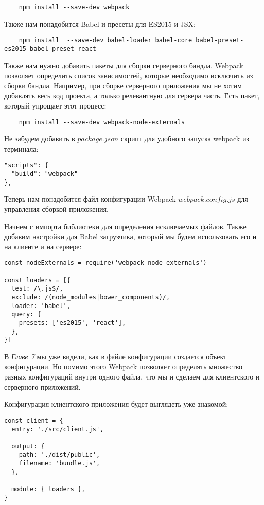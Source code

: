\begin{lstlisting}
	npm install --save-dev webpack
\end{lstlisting}

Также нам понадобится Babel и пресеты для ES2015 и JSX:

\begin{lstlisting}
	npm install  --save-dev babel-loader babel-core babel-preset-es2015 babel-preset-react
\end{lstlisting}

Также нам нужно добавить пакеты для сборки серверного бандла. 
Webpack позволяет определить список зависимостей, которые необходимо исключить из сборки бандла. Например, при сборке серверного приложения мы не хотим добавлять весь код проекта, а только релевантную для сервера часть. Есть пакет, который упрощает этот процесс:

\begin{lstlisting}
	npm install --save-dev webpack-node-externals
\end{lstlisting}

Не забудем добавить в $package.json$ скрипт для удобного запуска webpack из терминала:

\begin{lstlisting}
"scripts": {
  "build": "webpack"
},
\end{lstlisting}

Теперь нам понадобится файл конфигурации Webpack $webpack.config.js$ для управления сборкой приложения.

Начнем с импорта библиотеки для определения исключаемых файлов. Также добавим настройки для Babel загрузчика, который мы будем использовать его и на клиенте и на сервере:

\begin{lstlisting}
const nodeExternals = require('webpack-node-externals')

const loaders = [{
  test: /\.js$/,
  exclude: /(node_modules|bower_components)/,
  loader: 'babel',
  query: {
    presets: ['es2015', 'react'],
  },
}]
\end{lstlisting}

В \textit{Главе 7} мы уже видели, как в файле конфигурации создается объект конфигурации. Но помимо этого Webpack позволяет определять множество разных конфигураций внутри одного файла, что мы и сделаем для клиентского и серверного приложений.

Конфигурация клиентского приложения будет выглядеть уже знакомой:

\begin{lstlisting}
const client = {
  entry: './src/client.js',
  
  output: {
    path: './dist/public',
    filename: 'bundle.js',
  },
  
  module: { loaders },
}
\end{lstlisting}


